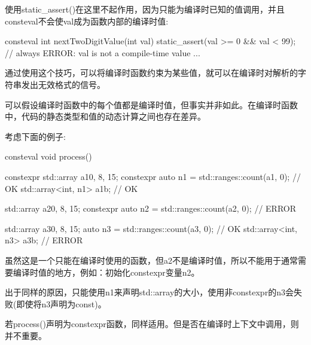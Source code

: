 使用static\_assert()在这里不起作用，因为只能为编译时已知的值调用，并且consteval不会使val成为函数内部的编译时值:

\begin{cpp}
consteval int nextTwoDigitValue(int val)
{
	static_assert(val >= 0 && val < 99); // always ERROR: val is not a compile-time value
	...
}
\end{cpp}

通过使用这个技巧，可以将编译时函数约束为某些值，就可以在编译时对解析的字符串发出无效格式的信号。


可以假设编译时函数中的每个值都是编译时值，但事实并非如此。在编译时函数中，代码的静态类型和值的动态计算之间也存在差异。

考虑下面的例子:

\begin{cpp}
consteval void process()
{
	constexpr std::array a1{0, 8, 15};
	constexpr auto n1 = std::ranges::count(a1, 0); // OK
	std::array<int, n1> a1b; // OK

	std::array a2{0, 8, 15};
	constexpr auto n2 = std::ranges::count(a2, 0); // ERROR

	std::array a3{0, 8, 15};
	auto n3 = std::ranges::count(a3, 0); // OK
	std::array<int, n3> a3b; // ERROR
}
\end{cpp}

虽然这是一个只能在编译时使用的函数，但a2不是编译时值，所以不能用于通常需要编译时值的地方，例如：初始化constexpr变量n2。

出于同样的原因，只能使用n1来声明std::array的大小，使用非constexpr的n3会失败(即使将n3声明为const)。

若process()声明为constexpr函数，同样适用。但是否在编译时上下文中调用，则并不重要。





